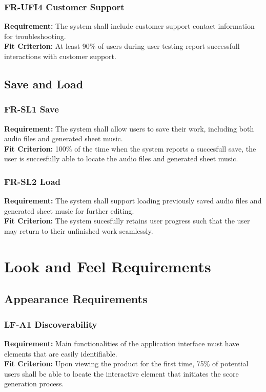 \documentclass[12pt]{article}
\begin{document}
\subsubsection*{FR-UFI4 Customer Support} \label{FR-UI4}
\textbf{Requirement:} The system shall include customer support contact information for troubleshooting. \\
\textbf{Fit Criterion:} At least 90\% of users during user testing report successfull interactions with customer support.

\subsection{Save and Load}
\subsubsection*{FR-SL1 Save} \label{FR-SL1}
\textbf{Requirement:} The system shall allow users to save their work, including both audio files and generated sheet music. \\
\textbf{Fit Criterion:} 100\% of the time when the system reports a succesfull save, the user is succesfully able to locate the audio files and generated sheet music.
\subsubsection*{FR-SL2 Load} \label{FR-SL2}
\textbf{Requirement:} The system shall support loading previously saved audio files and generated sheet music for further editing. \\
\textbf{Fit Criterion:} The system sucesfully retains user progress such that the user may return to their unfinished work seamlessly.


\section{Look and Feel Requirements}
\subsection{Appearance Requirements}
\subsubsection*{LF-A1 Discoverability} \label{LF-A1}
\textbf{Requirement:} Main functionalities of the application interface must have elements that are easily identifiable.\\
\textbf{Fit Criterion:} Upon viewing the product for the first time, 75\% of potential 
users shall be able to locate the interactive element that initiates the score generation process.
\end{document}

